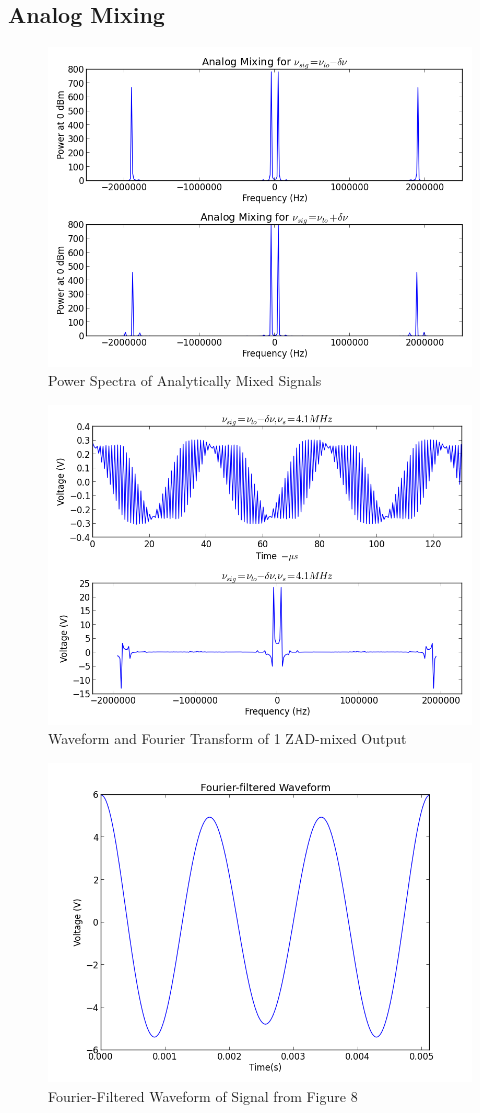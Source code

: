 \documentclass[12pt]{article}
\begin{document}
\subsection{Analog Mixing}
\begin{figure}[!h]
\caption{Power Spectra of Analytically Mixed Signals}
\centering
\includegraphics[width=.75\textwidth]{mixerspec.png}\end{figure}
\begin{figure}[!h]
\caption{Waveform and Fourier Transform of 1 ZAD-mixed Output}
\centering
\includegraphics[width=.75\textwidth]{mixerwave.png}\end{figure}
\begin{figure}[!h]
\caption{Fourier-Filtered Waveform of Signal from Figure 8}
\centering
\includegraphics[width=.75\textwidth]{mixerfourier.png}\end{figure}
\newpage
\end{document}
